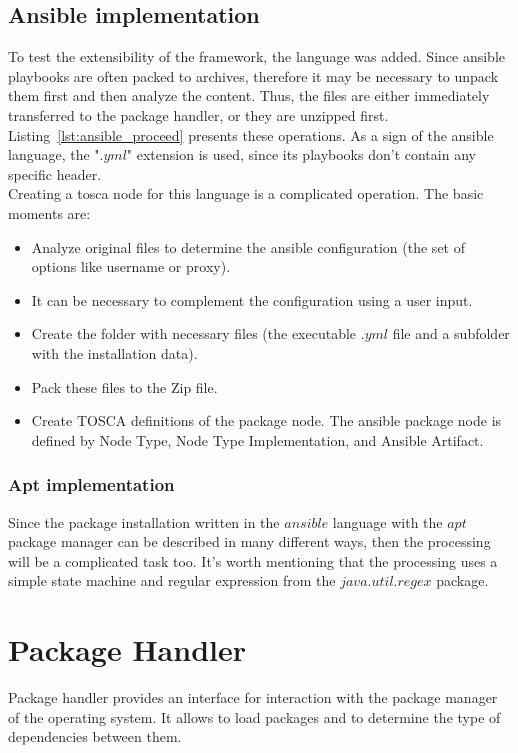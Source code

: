 \subsection*{Ansible implementation}
To test the extensibility of the framework, the  language was added.
Since ansible playbooks are often packed to archives, therefore it may be necessary to unpack them first and then analyze the content.
Thus, the files are either immediately transferred to the package handler, or they are unzipped first.
Listing~\ref{lst:ansible_proceed} presents these operations.
As a sign of the ansible language, the ".$yml$" extension is used, since its playbooks don't contain any specific header.\\
Creating a \gls{tosca} node for this language is a complicated operation. 
The basic moments are:
\begin{itemize}
	\item Analyze original files to determine the ansible configuration (the set of options like username or proxy).
	\item It can be necessary to complement the configuration using a user input.
	\item Create the folder with necessary files (the executable $.yml$ file and a subfolder with the installation data).
	\item Pack these files to the Zip file.
	\item Create TOSCA definitions of the package node. The ansible package node is defined by Node Type, Node Type Implementation, and Ansible Artifact.
\end{itemize} 

\subsubsection*{Apt implementation}
Since the package installation written in the $ansible$ language with the $apt$ package manager can be described in many different ways, then the processing will be a complicated task too.
It's worth mentioning that the processing uses a simple state machine and regular expression from the $java$.$util$.$regex$ package.

\section{Package Handler}
Package handler provides an interface for interaction with the package manager of the operating system.
It allows to load packages and to determine the type of dependencies between them.

